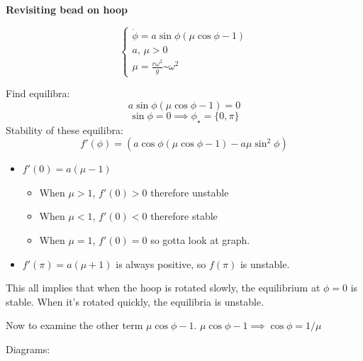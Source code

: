 \documentclass[main.tex]{subfiles}
\begin{document}
\textbf{Revisiting bead on hoop}

$$\begin{cases}
    \dot{\phi} = a\sin{\phi}(\mu\cos{\phi-1}) \\
    a\textrm{, }\mu > 0 \\
    \mu = \frac{r\omega^2}{g} \textrm{\textasciitilde} \omega^2
\end{cases}$$

Find equilibra:
$$a\sin{\phi}(\mu\cos{\phi-1}) = 0$$
$$\sin{\phi} = 0 \implies \phi_\star = \{0, \pi\}$$
Stability of these equilibra:
$$f'(\phi) = \left(a\cos{\phi}(\mu\cos{\phi} - 1) - a\mu\sin^2{\phi}\right)$$
\begin{itemize}
    \item $f'(0) = a(\mu - 1)$
    \begin{itemize}
        \item When $\mu > 1$, $f'(0) > 0$ therefore unstable
        \item When $\mu < 1$, $f'(0) < 0$ therefore stable
        \item When $\mu = 1$, $f'(0) = 0$ so gotta look at graph.
    \end{itemize}
    \item $f'(\pi) = a(\mu + 1)$ is always positive, so $f(\pi)$ is unstable.
\end{itemize}

This all implies that when the hoop is rotated slowly, the equilibrium at $\phi = 0$ is stable. When it's rotated quickly, the equilibria is unstable.

Now to examine the other term $\mu\cos{\phi} - 1$.
$\mu\cos{\phi} - 1\implies \cos{\phi} = 1/\mu$

Diagrams:
\end{document}
